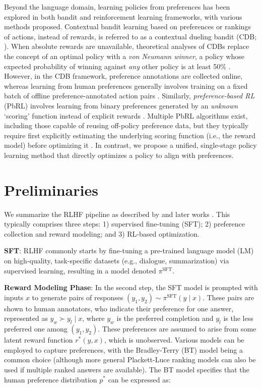 Beyond the language domain, learning policies from preferences has been explored in both bandit and reinforcement learning frameworks, with various methods proposed. Contextual bandit learning based on preferences or rankings of actions, instead of rewards, is referred to as a contextual dueling bandit (CDB; \cite{yue2012karmed,dudik2015contextual}). When absolute rewards are unavailable, theoretical analyses of CDBs replace the concept of an optimal policy with a \textit{von Neumann winner}, a policy whose expected probability of winning against \textit{any} other policy is at least 50\% \citep{dudik2015contextual}. However, in the CDB framework, preference annotations are collected online, whereas learning from human preferences generally involves training on a fixed batch of offline preference-annotated action pairs \citep{yan2022human}. Similarly, \textit{preference-based RL} (PbRL) involves learning from binary preferences generated by an \textit{unknown} `scoring' function instead of explicit rewards \citep{BusaFekete2014,ruiz2023dueling}. Multiple PbRL algorithms exist, including those capable of reusing off-policy preference data, but they typically require first explicitly estimating the underlying scoring function (i.e., the reward model) before optimizing it \citep{jain2013learning,BusaFekete2014,christiano2017deep,sadigh2017active,kupcsik2018learning}. In contrast, we propose a unified, single-stage policy learning method that directly optimizes a policy to align with preferences.

\section{Preliminaries}\label{section:prelims}

We summarize the RLHF pipeline as described by \citeauthor{ziegler2020finetuning} and later works \citep{stiennon2022learning, bai2022training, ouyang2022training}. This typically comprises three steps: 1) supervised fine-tuning (SFT); 2) preference collection and reward modeling; and 3) RL-based optimization.

\textbf{SFT}: RLHF commonly starts by fine-tuning a pre-trained language model (LM) on high-quality, task-specific datasets (e.g., dialogue, summarization) via supervised learning, resulting in a model denoted $\pi^\text{SFT}$.

\textbf{Reward Modeling Phase}: In the second step, the SFT model is prompted with inputs $x$ to generate pairs of responses $(y_1, y_2) \sim \pi^\text{SFT}(y \mid x)$. These pairs are shown to human annotators, who indicate their preference for one answer, represented as $y_w \succ y_l \mid x$, where $y_w$ is the preferred completion and $y_l$ is the less preferred one among $(y_1, y_2)$. These preferences are assumed to arise from some latent reward function $r^*(y, x)$, which is unobserved. Various models can be employed to capture preferences, with the Bradley-Terry (BT) model \cite{bradley1952rankanalysis} being a common choice (although more general Plackett-Luce ranking models \citep{plackett1975analysis, luce2012individual} can also be used if multiple ranked answers are available). The BT model specifies that the human preference distribution $p^*$ can be expressed as:

